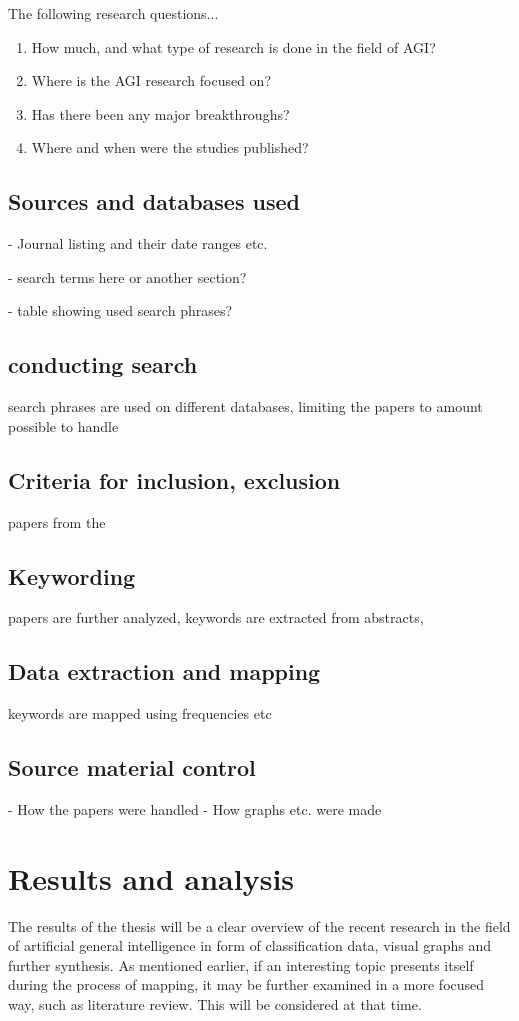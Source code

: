 \documentclass[utf8,english]{gradu3}
\begin{document}
The following research questions...

\begin{enumerate}
  \item How much, and what type of research is done in the field of AGI?
  \item Where is the AGI research focused on?
  \item Has there been any major breakthroughs?
  \item Where and when were the studies published?
\end{enumerate}

\section{Sources and databases used}
- Journal listing and their date ranges etc.

- search terms here or another section? 

- table showing used search phrases?

\section{conducting search}
search phrases are used on different databases, limiting the papers to amount possible to handle

\section{Criteria for inclusion, exclusion}
papers from the 

\section{Keywording}
papers are further analyzed, keywords are extracted from abstracts, 

\section{Data extraction and mapping}
keywords are mapped using frequencies etc

\section{Source material control}
- How the papers were handled
- How graphs etc. were made

\chapter{Results and analysis}
The results of the thesis will be a clear overview of the recent research in the field of artificial general intelligence in form of classification data, visual graphs and further synthesis. As mentioned earlier, if an interesting topic presents itself during the process of mapping, it may be further examined in a more focused way, such as literature review. This will be considered at that time.
\end{document}
